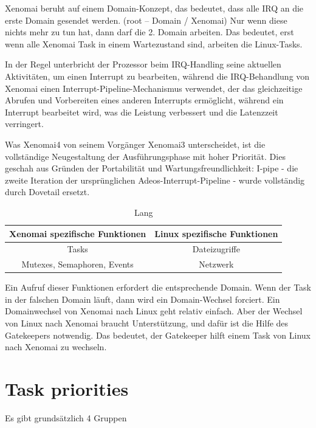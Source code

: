 \documentclass[MMR,Master,english]{twbook}
\begin{document}
\noindent Xenomai beruht auf einem Domain-Konzept, das bedeutet, dass alle IRQ an die erste Domain gesendet werden. (root – Domain / Xenomai)
Nur wenn diese nichts mehr zu tun hat, dann darf die 2. Domain arbeiten.
Das bedeutet, erst wenn alle Xenomai Task in einem Wartezustand sind, arbeiten die Linux-Tasks.

\noindent In der Regel unterbricht der Prozessor beim IRQ-Handling seine aktuellen Aktivitäten, um einen Interrupt zu bearbeiten, während die IRQ-Behandlung von Xenomai einen Interrupt-Pipeline-Mechanismus verwendet, der das gleichzeitige Abrufen und Vorbereiten eines anderen Interrupts ermöglicht, während ein Interrupt bearbeitet wird, was die Leistung verbessert und die Latenzzeit verringert.  

\noindent Was Xenomai4 von seinem Vorgänger Xenomai3 unterscheidet, ist die vollständige Neugestaltung der Ausführungsphase mit hoher Priorität. Dies geschah aus Gründen der Portabilität und Wartungsfreundlichkeit: I-pipe - die zweite Iteration der ursprünglichen Adeos-Interrupt-Pipeline - wurde vollständig durch Dovetail ersetzt. 

\begin{table}[H]
    \centering
    \caption[Kurz]{Lang}
    \label{tab:domain_specific_functions}
    \begin{tabular}{|c|c|}
        \hline
        \textbf{Xenomai spezifische Funktionen} & \textbf{Linux spezifische Funktionen} \\ \hline
        Tasks                                   & Dateizugriffe                           \\ \hline
        Mutexes, Semaphoren, Events             & Netzwerk                                \\ \hline
    \end{tabular}
\end{table}


\noindent Ein Aufruf dieser Funktionen erfordert die entsprechende Domain. Wenn der Task in der falschen Domain läuft, dann wird ein Domain-Wechsel forciert.
Ein Domainwechsel von Xenomai nach Linux geht relativ einfach. Aber der Wechsel von Linux nach Xenomai braucht Unterstützung, und dafür ist die Hilfe des Gatekeepers notwendig. Das bedeutet, der Gatekeeper hilft einem Task von Linux nach Xenomai zu wechseln.

\section{Task priorities}
Es gibt grundsätzlich 4 Gruppen
\end{document}
